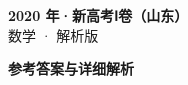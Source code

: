 \documentclass[zihao=-4, a4paper]{ctexart}
\begin{document}
\begin{center}
  {\Large\bfseries 2020 年·新高考Ⅰ卷（山东）}\\[4pt]
  {\large 数学 · 解析版}
\end{center}
\medskip
{}

\clearpage
{}
\begin{center}{\Large\bfseries 参考答案与详细解析}\end{center}
\medskip

\end{document}
